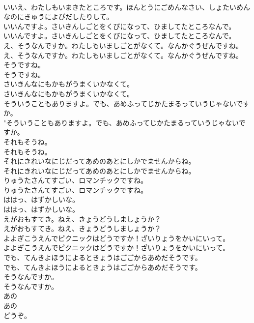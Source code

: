 \documentclass[8pt]{extreport}
\begin{document}
\begin{CJK}{UTF8}{min}
\\	いいえ、わたしもいまきたところです。ほんとうにごめんなさい、しょたいめんなのにきゅうによびだしたりして。 
\\	いいんですよ。さいきんしごとをくびになって、ひましてたところなんで。	
\\	いいんですよ。さいきんしごとをくびになって、ひましてたところなんで。 
\\	え、そうなんですか。わたしもいましごとがなくて。なんかぐうぜんですね。	
\\	え、そうなんですか。わたしもいましごとがなくて。なんかぐうぜんですね。 
\\	そうですね。	
\\	そうですね。 
\\	さいきんなにもかもがうまくいかなくて。	
\\	さいきんなにもかもがうまくいかなくて。 
\\	そういうこともありますよ。でも、あめふってじかたまるっていうじゃないですか。	
\\	"そういうこともありますよ。でも、あめふってじかたまるっていうじゃないですか。 
\\	それもそうね。	
\\	それもそうね。 
\\	それにきれいなにじだってあめのあとにしかでませんからね。	
\\	それにきれいなにじだってあめのあとにしかでませんからね。 
\\	りゅうたさんてすごい、ロマンチックですね。	
\\	りゅうたさんてすごい、ロマンチックですね。 
\\	ははっ、はずかしいな。	
\\	ははっ、はずかしいな。 
\\	えがおもすてき。ねえ、きょうどうしましょうか？	
\\	えがおもすてき。ねえ、きょうどうしましょうか？ 
\\	よよぎこうえんでピクニックはどうですか！ざいりょうをかいにいって。	
\\	よよぎこうえんでピクニックはどうですか！ざいりょうをかいにいって。 
\\	でも、てんきよほうによるときょうはごごからあめだそうです。	
\\	でも、てんきよほうによるときょうはごごからあめだそうです。 
\\	そうなんですか。	
\\	そうなんですか。 
\\	あの
\\	あの
\\	どうぞ。	

\end{CJK}
\end{document}
